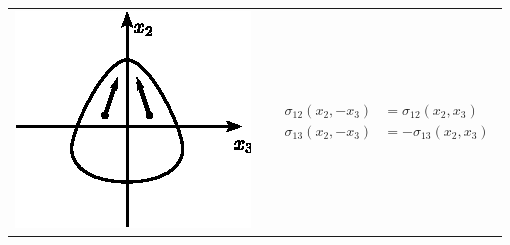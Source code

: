 \begin{tabular}{m{2cm}p{1cm}m{8cm}}
    \includegraphics{../images/T1_Ch07-20}&&
    \begin{equation}
        \begin{aligned}
            \sigma_{12} (x_2, -x_3) &= \sigma_{12} (x_2, x_3) \\[3pt]
            \sigma_{13} (x_2, -x_3) &= -\sigma_{13} (x_2, x_3)
        \end{aligned}
        \label{eq:Ch07-119}
    \end{equation}
\end{tabular}

